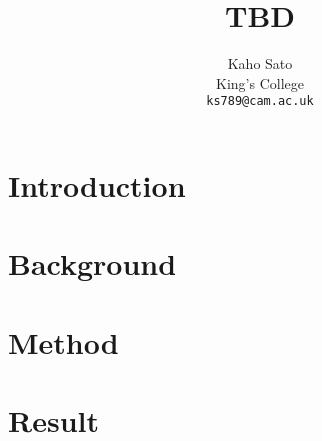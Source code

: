 \documentclass[11pt]{article}
\title{TBD}
\author{Kaho Sato \\
King's College \\
  {\tt ks789@cam.ac.uk}}
\date{}
\begin{document}
\maketitle

\section{Introduction}


\section{Background}


\section{Method}


\section{Result}




\end{document}
